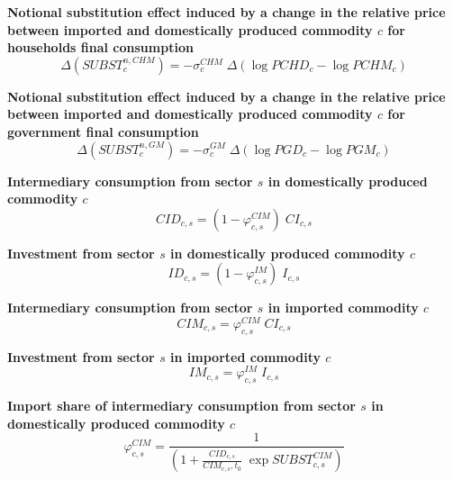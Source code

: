 \documentclass[12pt]{article}
\numberwithin{equation}{section}
\begin{document}
\noindent\textbf{Notional substitution effect induced by a change in the relative price between imported and domestically produced commodity $c$ for households final consumption} \\
\begin{dmath}
\varDelta \left(SUBST^{n,CHM}_{c}\right) = -\sigma^{CHM}_{c} \; \varDelta \left(\operatorname{log} PCHD_{c} - \operatorname{log} PCHM_{c}\right)
\end{dmath}

\noindent\textbf{Notional substitution effect induced by a change in the relative price between imported and domestically produced commodity $c$ for government final consumption} \\
\begin{dmath}
\varDelta \left(SUBST^{n,GM}_{c}\right) = -\sigma^{GM}_{c} \; \varDelta \left(\operatorname{log} PGD_{c} - \operatorname{log} PGM_{c}\right)
\end{dmath}

\noindent\textbf{Intermediary consumption from sector $s$ in domestically produced commodity $c$} \\
\begin{dmath}
CID_{c, s} = \left( 1 - \varphi^{CIM}_{c, s} \right) \; CI_{c, s}
\end{dmath}

\noindent\textbf{Investment from sector $s$ in domestically produced commodity $c$} \\
\begin{dmath}
ID_{c, s} = \left( 1 - \varphi^{IM}_{c, s} \right) \; I_{c, s}
\end{dmath}

\noindent\textbf{Intermediary consumption from sector $s$ in imported commodity $c$} \\
\begin{dmath}
CIM_{c, s} = \varphi^{CIM}_{c, s} \; CI_{c, s}
\end{dmath}

\noindent\textbf{Investment from sector $s$ in imported commodity $c$} \\
\begin{dmath}
IM_{c, s} = \varphi^{IM}_{c, s} \; I_{c, s}
\end{dmath}

\noindent\textbf{Import share of intermediary consumption from sector $s$ in domestically produced commodity $c$} \\
\begin{dmath}
\varphi^{CIM}_{c, s} = \frac{1}{\left( 1 + \frac{CID_{c, s}}{CIM_{c, s}, t_{0}} \; \operatorname{exp} SUBST^{CIM}_{c, s} \right)}
\end{dmath}
\end{document}
